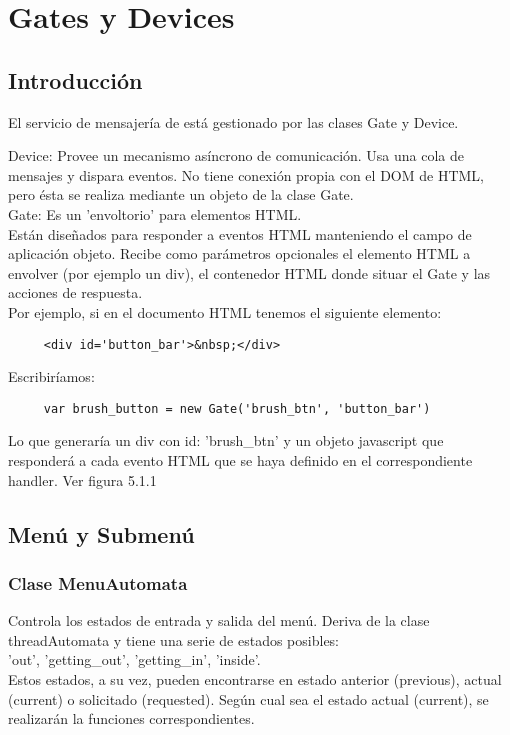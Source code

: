 \section{Gates y Devices}
\label{sec:gates_devices}

\subsection{Introducción}
\label{subsection:intro_gates}

El servicio de mensajería de \lluvia{} está gestionado por las clases Gate y Device.

Device: Provee un mecanismo asíncrono de comunicación. Usa una cola de mensajes y dispara eventos. No tiene conexión propia con el DOM de HTML,
pero ésta se realiza mediante un objeto de la clase Gate.\\

Gate: Es un 'envoltorio' para elementos HTML.\\

Están diseñados para responder a eventos HTML manteniendo el campo de aplicación objeto. Recibe como parámetros opcionales el elemento HTML a 
envolver (por ejemplo un div), el contenedor HTML donde situar el Gate y las acciones de respuesta.\\

Por ejemplo, si en el documento HTML tenemos el siguiente elemento:
\begin{verbatim}
     <div id='button_bar'>&nbsp;</div>
\end{verbatim}
Escribiríamos:
\begin{verbatim}
     var brush_button = new Gate('brush_btn', 'button_bar')
\end{verbatim}
Lo que generaría un div con id: 'brush\_btn' y un objeto javascript que responderá a cada evento HTML que se haya definido en el correspondiente 
handler. Ver figura 5.1.1


\subsection{Menú y Submenú}
\label{subsection:menu}

\subsubsection{Clase MenuAutomata}
\label{subsubsection:menu_automata}

Controla los estados de entrada y salida del menú. Deriva de la clase threadAutomata y tiene una serie de estados posibles:\\
'out', 'getting\_out', 'getting\_in', 'inside'.\\
Estos estados, a su vez, pueden encontrarse en estado anterior (previous), actual (current) o solicitado (requested). Según cual sea  el estado 
actual (current), se realizarán la funciones correspondientes.\\


